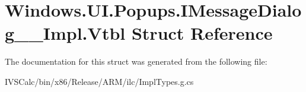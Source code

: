 \hypertarget{struct_windows_1_1_u_i_1_1_popups_1_1_i_message_dialog_____impl_1_1_vtbl}{}\section{Windows.\+U\+I.\+Popups.\+I\+Message\+Dialog\+\_\+\+\_\+\+Impl.\+Vtbl Struct Reference}
\label{struct_windows_1_1_u_i_1_1_popups_1_1_i_message_dialog_____impl_1_1_vtbl}


The documentation for this struct was generated from the following file\+:\begin{DoxyCompactItemize}
\item 
I\+V\+S\+Calc/bin/x86/\+Release/\+A\+R\+M/ilc/Impl\+Types.\+g.\+cs\end{DoxyCompactItemize}

